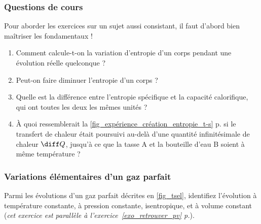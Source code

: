 \begin{boiboiboite}
	\propeau
	\propair
	\isentropiques
	\deltaentropie
	\efficacitescarnot
\end{boiboiboite}


\subsubsection{Questions de cours}
\label{exo_questions_cours}
	
	Pour aborder les exercices sur un sujet aussi consistant, il faut d’abord bien maîtriser les fondamentaux !

	\begin{enumerate}
		\item Comment calcule-t-on la variation d’entropie d’un corps pendant une évolution réelle quelconque ?
		\item Peut-on faire diminuer l’entropie d’un corps ?
		\item Quelle est la différence entre l’entropie spécifique et la capacité calorifique, qui ont toutes les deux les mêmes unités ?
		\item À quoi ressemblerait la \cref{fig_expérience_création_entropie_t-s} p.\pageref{fig_expérience_création_entropie_t-s} si le transfert de chaleur était poursuivi au-delà d’une quantité infinitésimale de chaleur $\diff Q$, jusqu’à ce que la tasse A et la bouteille d’eau B soient à même température ?
	\end{enumerate}

\subsubsection{Variations élémentaires d’un gaz parfait}
\label{exo_ts_variations_elementaires}

	Parmi les évolutions d’un gaz parfait décrites en \cref{fig_tsel}, identifiez l’évolution à température constante, à pression constante, isentropique, et à volume constant (\textit{cet exercice est parallèle à l’exercice~\ref{exo_retrouver_pv} p.\pageref{exo_retrouver_pv}}).
	
